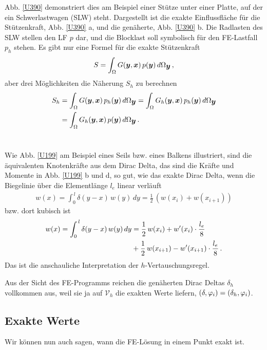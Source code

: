 {Abb. \ref{U390} demonstriert dies am Beispiel einer St\"{u}tze unter einer Platte, auf der ein Schwerlastwagen (SLW) steht. Dargestellt ist die exakte Einflussfl\"{a}che f\"{u}r die St\"{u}tzenkraft, Abb. \ref{U390} a, und die gen\"{a}herte, Abb. \ref{U390} b. Die Radlasten des SLW stellen den LF $p$ dar, und die Blocklast soll symbolisch f\"{u}r den FE-Lastfall $p_h$ stehen. Es gibt nur eine Formel f\"{u}r die exakte St\"{u}tzenkraft
\begin{align}
S = \int_{\Omega} G(\mbox{\boldmath $y$},\mbox{\boldmath $x$})\,p(\mbox{\boldmath $y$})\,d\Omega_{\mbox{\boldmath $y$}}\,,
\end{align}
aber drei M\"{o}glichkeiten die N\"{a}herung $S_h$ zu berechnen
\begin{align}
S_h &= \int_{\Omega} G(\mbox{\boldmath $y$},\mbox{\boldmath $x$})\,p_h(\mbox{\boldmath $y$})\,d\Omega_{\mbox{\boldmath $y$}} = \int_{\Omega} G_h(\mbox{\boldmath $y$},\mbox{\boldmath $x$})\,p_h(\mbox{\boldmath $y$})\,d\Omega_{\mbox{\boldmath $y$}}\nonumber \\
 &= \int_{\Omega} G_h(\mbox{\boldmath $y$},\mbox{\boldmath $x$})\,p(\mbox{\boldmath $y$})\,d\Omega_{\mbox{\boldmath $y$}}\,.
\end{align}
\\

\begin{remark}
Wie Abb. \ref{U199} am Beispiel eines Seils bzw. eines Balkens illustriert, sind die \"{a}quivalenten Knotenkr\"{a}fte aus dem Dirac Delta, das sind die Kr\"{a}fte und Momente in Abb. \ref{U199} b und d, so gut, wie das exakte Dirac Delta, wenn die Biegelinie \"{u}ber die Elementl\"{a}nge $l_e$ linear verl\"{a}uft
\begin{align}
w(x) = \int_0^{\,l} \delta(y-x)\,w(y)\,dy = \frac{1}{2}\, (w(x_i) + w(x_{i + 1}))
\end{align}
bzw. dort kubisch ist
\begin{align}
w(x) = \int_0^{\,l} \delta(y-x)\,w(y)\,dy &= \frac{1}{2}\,w(x_i) + w'(x_i) \cdot \frac{l_e}{8}\nonumber \\
&+ \frac{1}{2}\,w(x_{i+1}) -  w'(x_{i+1}) \cdot \frac{l_e}{8}\,.
\end{align}
Das ist die anschauliche Interpretation der $h$-Vertauschungsregel.

Aus der Sicht des FE-Programms reichen die gen\"{a}herten Dirac Deltas $\delta_h$ vollkommen aus, weil sie ja auf $\mathcal{V}_h$ die exakten Werte liefern, $(\delta,\varphi_i) = (\delta_h,\varphi_i)$.

\end{remark}

{\textcolor{sectionTitleBlue}{\section{Exakte Werte}}}
Wir k\"{o}nnen nun auch sagen, wann die FE-L\"{o}sung
in einem Punkt exakt ist.\\

}
